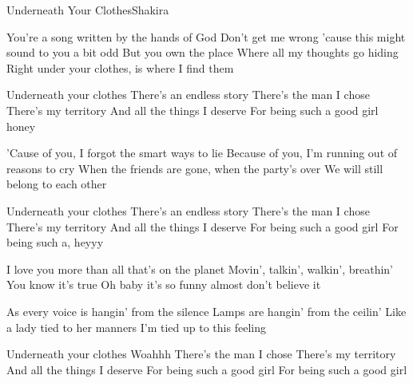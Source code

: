 \begin{Song}{Underneath Your Clothes}{Shakira}
\begin{multicols}{2}
\begin{Verse}
You're a song written by the hands of God
Don't get me wrong
'cause this might sound to you a bit odd
But you own the place
Where all my thoughts go hiding
Right under your clothes, is where I find them
\end{Verse}
\espaceInterStrophe

\begin{Chorus}
Underneath your clothes
There's an endless story
There's the man I chose
There's my territory
And all the things I deserve
For being such a good girl honey
\end{Chorus}
\espaceInterStrophe

\begin{Verse}
'Cause of you, I forgot the smart ways to lie
Because of you, I'm running out of reasons to cry
When the friends are gone, when the party's over
We will still belong to each other
\end{Verse}
\espaceInterStrophe

\tochorus
\espaceInterStrophe

\begin{Chorus}
Underneath your clothes
There's an endless story
There's the man I chose
There's my territory
And all the things I deserve
For being such a good girl
For being such a, heyyy
\end{Chorus}
\espaceInterStrophe

\begin{Verse}
I love you more than all that's on the planet
Movin', talkin', walkin', breathin'
You know it's true
Oh baby it's so funny almost don't believe it
\espaceInterStrophe

As every voice is hangin' from the silence
Lamps are hangin' from the ceilin'
Like a lady tied to her manners
I'm tied up to this feeling
\end{Verse}
\espaceInterStrophe

\tochorus
\espaceInterStrophe

\begin{Chorus}
Underneath your clothes
Woahhh
There's the man I chose
There's my territory
And all the things I deserve
For being such a good girl
For being such a good girl
\end{Chorus}
\end{multicols}

\vfill


\end{Song}
